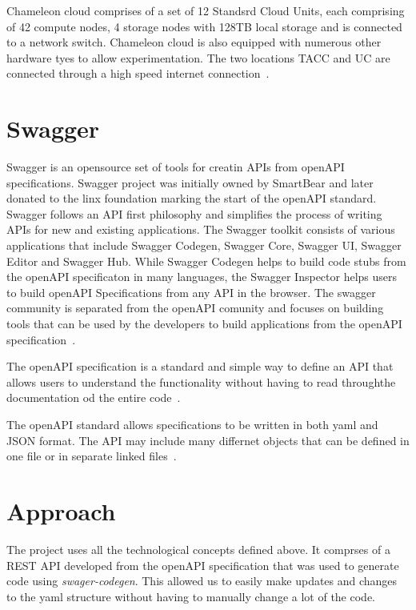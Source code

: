 Chameleon cloud comprises of a set of 12 Standsrd Cloud Units, each
comprising of 42 compute nodes, 4 storage nodes with 128TB local
storage and is connected to a network switch. Chameleon cloud is also
equipped with numerous other hardware tyes to allow
experimentation. The two locations TACC and UC are connected through a
high speed internet connection~\cite{hid-sp18-503-handbook}.

\section{Swagger}
Swagger is an opensource set of tools for creatin APIs from openAPI
specifications. Swagger project was initially owned by SmartBear and
later donated to the linx foundation marking the start of the openAPI
standard. Swagger follows an API first philosophy and simplifies the
process of writing APIs for new and existing applications.  The
Swagger toolkit consists of various applications that include Swagger
Codegen, Swagger Core, Swagger UI, Swagger Editor and Swagger
Hub. While Swagger Codegen helps to build code stubs from the openAPI
specificaton in many languages, the Swagger Inspector helps users to
build openAPI Specifications from any API in the browser.  The swagger
community is separated from the openAPI comunity and focuses on
building tools that can be used by the developers to build
applications from the openAPI
specification~\cite{hid-sp18-503-swagger}.

The openAPI specification is a standard and simple way to define an
API that allows users to understand the functionality without having
to read throughthe documentation od the entire
code~\cite{hid-sp18-503-swagger-openapi}.

The openAPI standard allows specifications to be written in both yaml
and JSON format. The API may include many differnet objects that can
be defined in one file or in separate linked
files~\cite{hid-sp18-503-swagger-openapi}.

\section{Approach}

The project uses all the technological concepts defined above. It
comprses of a REST API developed from the openAPI specification that
was used to generate code using \emph{swager-codegen}. This allowed us
to easily make updates and changes to the yaml structure without
having to manually change a lot of the code.

